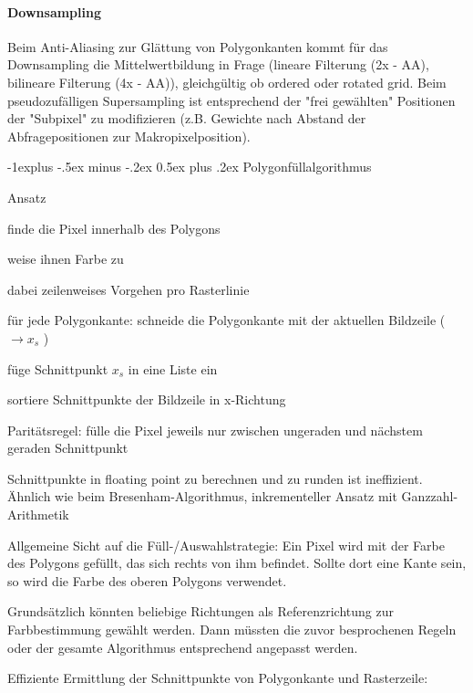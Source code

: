 \documentclass[landscape]{article}
\makeatletter
\renewcommand{\subsection}{\@startsection{subsection}{2}{0mm}%
                                {-1explus -.5ex minus -.2ex}%
                                {0.5ex plus .2ex}%
                                {\normalfont\normalsize\bfseries}}
\makeatother
\begin{document}
\begin{multicols}{3}
  \paragraph{Downsampling}
  Beim Anti-Aliasing zur Glättung von Polygonkanten kommt für das Downsampling die Mittelwertbildung in Frage (lineare Filterung (2x - AA), bilineare Filterung (4x - AA)), gleichgültig ob ordered oder rotated grid. Beim pseudozufälligen Supersampling ist entsprechend der "frei gewählten" Positionen der "Subpixel" zu modifizieren (z.B. Gewichte nach Abstand der Abfragepositionen zur Makropixelposition).
  
  \subsection{ Polygonfüllalgorithmus}
  \begin{itemize*}
    \item Ansatz
    \begin{itemize*}
      \item finde die Pixel innerhalb des Polygons
      \item weise ihnen Farbe zu
      \item dabei zeilenweises Vorgehen pro Rasterlinie
      \item für jede Polygonkante: schneide die Polygonkante mit der aktuellen Bildzeile ($\rightarrow x_s$ )
      \item füge Schnittpunkt $x_s$ in eine Liste ein
      \item sortiere Schnittpunkte der Bildzeile in x-Richtung
      \item Paritätsregel: fülle die Pixel jeweils nur zwischen ungeraden und nächstem geraden Schnittpunkt
    \end{itemize*}
    \item Schnittpunkte in floating point zu berechnen und zu runden ist ineffizient. Ähnlich wie beim Bresenham-Algorithmus, inkrementeller Ansatz mit Ganzzahl-Arithmetik
    \item Allgemeine Sicht auf die Füll-/Auswahlstrategie: Ein Pixel wird mit der Farbe des Polygons gefüllt, das sich rechts von ihm befindet. Sollte dort eine Kante sein, so wird die Farbe des oberen Polygons verwendet.
    \item Grundsätzlich könnten beliebige Richtungen als Referenzrichtung zur Farbbestimmung gewählt werden. Dann müssten die zuvor besprochenen Regeln oder der gesamte Algorithmus entsprechend angepasst werden.
    \item Effiziente Ermittlung der Schnittpunkte von Polygonkante und Rasterzeile:

\end{itemize*}
\end{multicols}
\end{document}
